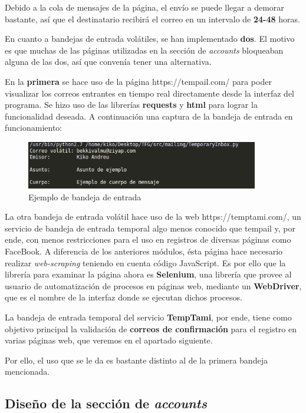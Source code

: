 Debido a la cola de mensajes de la página, el envío se puede llegar a demorar bastante, así que el destinatario recibirá el correo en un intervalo de \textbf{24-48} horas.

En cuanto a bandejas de entrada volátiles, se han implementado \textbf{dos}. El motivo es que muchas de las páginas utilizadas en la sección de \textit{accounts} bloqueaban alguna de las dos, así que convenía tener una alternativa.

En la \textbf{primera} se hace uso de la página https://tempail.com/ para poder visualizar los correos entrantes en tiempo real directamente desde la interfaz del programa. Se hizo uso de las librerías \textbf{requests} y \textbf{html} para lograr la funcionalidad deseada. A continuación una captura de la bandeja de entrada en funcionamiento:

\begin{figure}[H]
	\centerline{
		\mbox{\includegraphics[width=4.00in]{images/inbox1.png}}
	}
	\caption{Ejemplo de bandeja de entrada}
	\label{fig:tempail_inbox}
\end{figure}

La otra bandeja de entrada volátil hace uso de la web https://temptami.com/, un servicio de bandeja de entrada temporal algo menos conocido que tempail y, por ende, con menos restricciones para el uso en registros de diversas páginas como FaceBook. A diferencia de los anteriores módulos, ésta página hace necesario realizar \textit{web-scraping} teniendo en cuenta código JavaScript. Es por ello que la librería para examinar la página ahora es \textbf{Selenium}, una librería que provee al usuario de automatización de procesos en páginas web, mediante un \textbf{WebDriver}, que es el nombre de la interfaz donde se ejecutan dichos procesos. 

La bandeja de entrada temporal del servicio \textbf{TempTami}, por ende, tiene como objetivo principal la validación de \textbf{correos de confirmación} para el registro en varias páginas web, que veremos en el apartado siguiente. 

Por ello, el uso que se le da es bastante distinto al de la primera bandeja mencionada.

\subsection{Diseño de la sección de \textit{accounts}}

